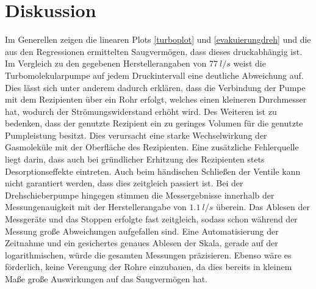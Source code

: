 \section{Diskussion}
Im Generellen zeigen die linearen Plots \ref{turboplot} und \ref{evakuierungdreh} und die aus den Regressionen ermittelten Saugvermögen,
dass dieses druckabhängig ist.
Im Vergleich zu den gegebenen Herstellerangaben von $\SI{77}{l/s}$ weist die Turbomolekularpumpe auf jedem Druckintervall eine deutliche Abweichung auf.
Dies lässt sich unter anderem dadurch erklären, dass die Verbindung der Pumpe mit dem Rezipienten über ein Rohr erfolgt, welches einen kleineren Durchmesser hat, wodurch der Strömungswiderstand erhöht wird.
Des Weiteren ist zu bedenken, dass der genutzte Rezipient ein zu geringes Volumen für die genutzte Pumpleistung besitzt. Dies verursacht eine starke Wechselwirkung der Gasmoleküle mit der Oberfläche des Rezipienten.
Eine zusätzliche Fehlerquelle liegt darin, dass auch bei gründlicher Erhitzung des Rezipienten stets Desorptionseffekte eintreten.
Auch beim händischen Schließen der Ventile kann nicht garantiert werden, dass dies zeitgleich passiert ist.
Bei der Drehschieberpumpe hingegen stimmen die Messergebnisse innerhalb der Messungenauigkeit mit der Herstellerangabe von $\SI{1,1}{l/s}$ überein.
Das Ablesen der Messgeräte und das Stoppen erfolgte fast zeitgleich, sodass schon während der Messung große Abweichungen aufgefallen sind.
Eine Automatisierung der Zeitnahme und ein gesichertes genaues Ablesen der Skala, gerade auf der logarithmischen, würde die gesamten Messungen präzisieren.
Ebenso wäre es förderlich, keine Verengung der Rohre einzubauen, da dies bereits in kleinem Maße große Auswirkungen auf das Saugvermögen hat.
